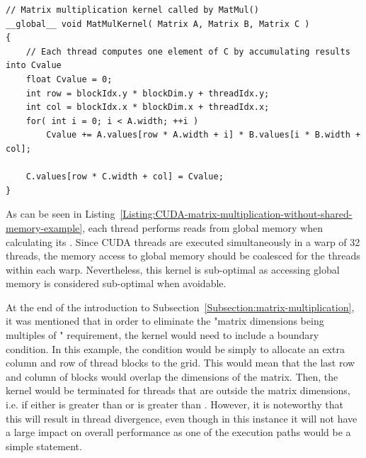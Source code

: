 \begin{lstlisting}[caption={Definition of the matrix multiplication kernel that uses global memory without shared memory. Each thread has a variable \code{Cvalue} stored in registers into which it calculates its specific \code{C(row, col)} matrix element. Taken from Nvidia's \emph{CUDA C++ Programming Guide} \cite{NVIDIAMay2022}.},label={Listing:CUDA-matrix-multiplication-without-shared-memory-example}]
// Matrix multiplication kernel called by MatMul()
__global__ void MatMulKernel( Matrix A, Matrix B, Matrix C )
{
	// Each thread computes one element of C by accumulating results into Cvalue
	float Cvalue = 0;
	int row = blockIdx.y * blockDim.y + threadIdx.y;
	int col = blockIdx.x * blockDim.x + threadIdx.x;
	for( int i = 0; i < A.width; ++i )
		Cvalue += A.values[row * A.width + i] * B.values[i * B.width + col];
	
	C.values[row * C.width + col] = Cvalue;
}
\end{lstlisting}

As can be seen in Listing~\ref{Listing:CUDA-matrix-multiplication-without-shared-memory-example}, each thread performs  reads from global memory when calculating its . Since CUDA threads are executed simultaneously in a warp of 32 threads, the memory access to global memory should be coalesced for the threads within each warp. Nevertheless, this kernel is sub-optimal as accessing global memory is considered sub-optimal when avoidable.
\par At the end of the introduction to Subsection~\ref{Subsection:matrix-multiplication}, it was mentioned that in order to eliminate the "matrix dimensions being multiples of " requirement, the kernel would need to include a boundary condition. In this example, the condition would be simply to allocate an extra column and row of thread blocks to the grid. This would mean that the last row and column of blocks would overlap the dimensions of the matrix. Then, the kernel would be terminated for threads that are outside the matrix dimensions, i.e. if either  is greater than  or  is greater than . However, it is noteworthy that this will result in thread divergence, even though in this instance it will not have a large impact on overall performance as one of the execution paths would be a simple  statement.

